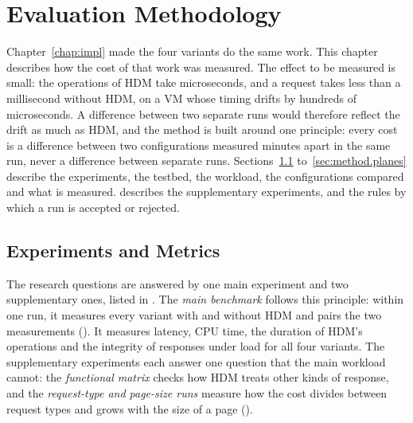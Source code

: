 \documentclass{rptuma}
\begin{document}
\chapter{Evaluation Methodology}
\label{chap:method}

Chapter~\ref{chap:impl} made the four variants do the same work. This chapter describes how the
cost of that work was measured. The effect to be measured is small: the operations of HDM take
microseconds, and a request takes less than a millisecond without HDM, on a VM whose
timing drifts by hundreds of microseconds. A difference between two separate runs would therefore
reflect the drift as much as HDM, and the method is built around one principle: every cost is a
difference between two configurations measured minutes apart in the same run, never a difference
between separate runs. Sections~\ref{sec:AB.metrics} to~\ref{sec:method.planes} describe the
experiments, the testbed, the workload, the configurations compared and what is measured.
 describes the supplementary experiments, and
 the rules by which a run is accepted or rejected.

\section{Experiments and Metrics}
\label{sec:AB.metrics}

The research questions are answered by one main experiment and two
supplementary ones, listed in . The \emph{main benchmark} follows
this principle: within one run, it measures every variant with and without HDM and pairs the two
measurements (). It measures latency, CPU time, the duration of HDM's operations and the integrity of
responses under load for all four variants. The supplementary experiments each answer one question
that the main workload cannot: the \emph{functional matrix} checks how HDM treats other kinds of
response, and the \emph{request-type and page-size runs} measure how the cost divides between
request types and grows with the size of a page ().
\end{document}

